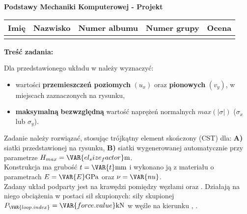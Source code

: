 \documentclass[a4paper,10pt]{article}
\begin{document}
\begin{center}
    {\Large \textbf{Podstawy Mechaniki Komputerowej - Projekt}}
    \end{center}

    \begin{table}[ht]
        \centering
        \begin{tabular}{
            m{}m{}m{}m{}m{}}
        \toprule
        Imię & Nazwisko & Numer albumu & Numer grupy  & Ocena \\ \midrule
             &          &              &              &       \\ \bottomrule
        \end{tabular}
        \label{tab:dane_studenta}
    \end{table}

    \noindent\textbf{Treść zadania:} \vspace{1mm}

    \noindent Dla przedstawionego układu w \textbf{} należy wyznaczyć:
    \begin{itemize}
        \item wartości \textbf{przemieszczeń poziomych} $(u_x)$ oraz \textbf{pionowych} $(v_y)$, w miejscach zaznaczonych na rysunku,
        \item \textbf{maksymalną} \textbf{bezwzględną} wartość naprężeń normalnych $max(|\sigma|)$ ($\sigma_x$ lub $\sigma_y$).
    \end{itemize}

    \noindent Zadanie należy rozwiązać, stosując trójkątny element skończony (CST) dla: \textbf{A)} siatki przedstawionej na rysunku, \textbf{B)} siatki wygenerowanej automatycznie przy parametrze $H_{max} = \VAR{el_size_factor} \si{m}$. \\
    Konstrukcja ma grubość $t = \VAR{t} \si{mm}$ i wykonano ją z materiału o parametrach $E = \VAR{E} \si{GPa}$ oraz $\nu = \VAR{nu}$. \\
    Zadany układ podparty jest na krawędzi pomiędzy węzłami
         oraz  %
    . 
    Działają na niego obciążenia w postaci 
             sił skupionych: 
             siły skupionej
        $P_\VAR{loop.index} = \VAR{force.value} \si{\kilo\newton}$ w węźle  na kierunku %
        , 
    . \newline
\end{document}
